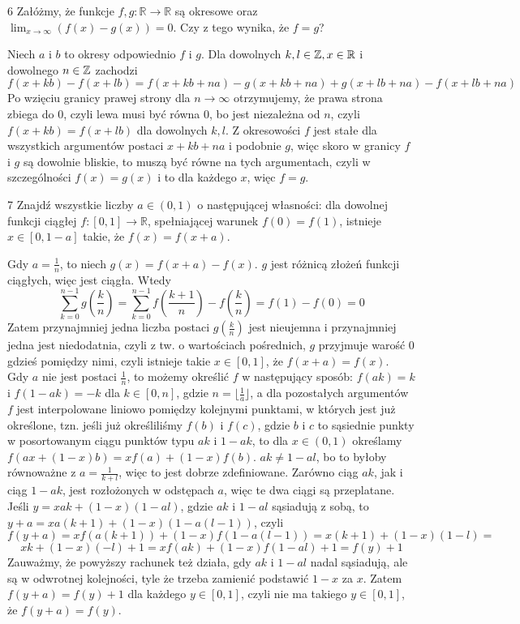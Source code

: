 \documentclass{../note}
\begin{document}
\begin{zadanie}{6}
Załóżmy, że funkcje $f,g:\mathbb{R}\rightarrow\mathbb{R}$ są okresowe oraz $\lim_{x\rightarrow \infty}(f(x)-g(x))=0.$ Czy z tego wynika, że $f=g$?
\end{zadanie}
\begin{rozwiazanie}
Niech $a$ i $b$ to okresy odpowiednio $f$ i $g$. Dla dowolnych $k, l \in \mathbb{Z}, x \in \mathbb{R}$ i dowolnego $n \in \mathbb{Z}$ zachodzi
\[f(x + kb) - f(x + lb) = f(x + kb + na) - g(x + kb + na) + g(x + lb + na) - f(x + lb + na)\]
Po wzięciu granicy prawej strony dla $n \to \infty$ otrzymujemy, że prawa strona zbiega do 0, czyli lewa musi być równa 0, bo jest niezależna od $n$, czyli $f(x + kb) = f(x + lb)$ dla dowolnych $k, l$. Z okresowości $f$ jest stałe dla wszystkich argumentów postaci $x + kb + na$ i podobnie $g$, więc skoro w granicy $f$ i $g$ są dowolnie bliskie, to muszą być równe na tych argumentach, czyli w szczególności $f(x) = g(x)$ i to dla każdego $x$, więc $f = g$.
\end{rozwiazanie}

\begin{zadanie}{7}
Znajdź wszystkie liczby $a\in(0,1)$ o następującej własności: dla dowolnej funkcji ciągłej $f:[0,1]\rightarrow\mathbb{R}$, spełniającej warunek $f(0)=f(1)$, istnieje $x\in[0,1-a]$ takie, że $f(x)=f(x+a).$
\end{zadanie}
\begin{rozwiazanie}
Gdy $a = \frac1n$, to niech $g(x) = f(x + a) - f(x)$. $g$ jest różnicą złożeń funkcji ciągłych, więc jest ciągła. Wtedy 
\[\sum_{k=0}^{n-1} g\left(\frac{k}{n}\right) = \sum_{k=0}^{n-1} f\left(\frac{k+1}{n}\right) - f\left(\frac{k}{n}\right) = f(1) - f(0) = 0\]
Zatem przynajmniej jedna liczba postaci $g\left(\frac{k}{n}\right)$ jest nieujemna i przynajmniej jedna jest niedodatnia, czyli z tw. o wartościach pośrednich, $g$ przyjmuje warość 0 gdzieś pomiędzy nimi, czyli istnieje takie $x\in [0, 1]$, że $f(x+a) = f(x)$.\\
Gdy $a$ nie jest postaci $\frac1n$, to możemy określić $f$ w następujący sposób: $f(ak) = k$ i $f(1-ak) = -k$ dla $k \in [0, n]$, gdzie $n = \lfloor\frac1a\rfloor$, a dla pozostałych argumentów $f$ jest interpolowane liniowo pomiędzy kolejnymi punktami, w których jest już określone, tzn. jeśli już określiliśmy $f(b)$ i $f(c)$, gdzie $b$ i $c$ to sąsiednie punkty w posortowanym ciągu punktów typu $ak$ i $1 - ak$, to dla $x \in (0, 1)$ określamy $f(ax + (1-x)b) = xf(a) + (1-x)f(b)$. $ak \neq 1 - al$, bo to byłoby równoważne z $a = \frac{1}{k+l}$, więc to jest dobrze zdefiniowane. Zarówno ciąg $ak$, jak i ciąg $1 - ak$, jest rozłożonych w odstępach $a$, więc te dwa ciągi są przeplatane. Jeśli $y = xak + (1-x)(1-al)$, gdzie $ak$ i $1-al$ sąsiadują z sobą, to $y + a = xa(k+1) + (1-x)(1-a(l-1))$, czyli
\[f(y + a) = xf(a(k+1)) + (1-x)f(1-a(l-1)) = x(k+1) + (1-x)(1-l) =\]\[ xk + (1-x)(-l) + 1 = xf(ak) + (1-x)f(1-al) + 1 = f(y) + 1\]
Zauważmy, że powyższy rachunek też działa, gdy $ak$ i $1-al$ nadal sąsiadują, ale są w odwrotnej kolejności, tyle że trzeba zamienić podstawić $1-x$ za $x$. Zatem $f(y + a) = f(y) + 1$ dla każdego $y \in [0, 1]$, czyli nie ma takiego $y \in [0, 1]$, że $f(y+a) = f(y)$.
\end{rozwiazanie}
\end{document}
